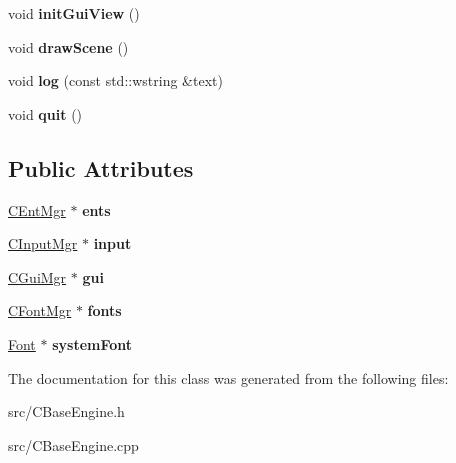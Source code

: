 \begin{DoxyCompactItemize}
\item 
\hypertarget{class_c_base_engine_a87e5248572323ef5847361177122ffcf}{
void {\bfseries initGuiView} ()}
\label{class_c_base_engine_a87e5248572323ef5847361177122ffcf}

\item 
\hypertarget{class_c_base_engine_adcff4ed3343e6e5ebd0d68c0945f72c7}{
void {\bfseries drawScene} ()}
\label{class_c_base_engine_adcff4ed3343e6e5ebd0d68c0945f72c7}

\item 
\hypertarget{class_c_base_engine_a58b7fcf0e4ab9d4a1bbc78d30af5d842}{
void {\bfseries log} (const std::wstring \&text)}
\label{class_c_base_engine_a58b7fcf0e4ab9d4a1bbc78d30af5d842}

\item 
\hypertarget{class_c_base_engine_a321c2e7107401c9d79277fa49bd28453}{
void {\bfseries quit} ()}
\label{class_c_base_engine_a321c2e7107401c9d79277fa49bd28453}

\end{DoxyCompactItemize}
\subsection*{Public Attributes}
\begin{DoxyCompactItemize}
\item 
\hypertarget{class_c_base_engine_a7bcd6139db14be811a9c5a70eeb8ef82}{
\hyperlink{class_c_ent_mgr}{CEntMgr} $\ast$ {\bfseries ents}}
\label{class_c_base_engine_a7bcd6139db14be811a9c5a70eeb8ef82}

\item 
\hypertarget{class_c_base_engine_afd4d462278f92d88035c1709f707b341}{
\hyperlink{class_c_input_mgr}{CInputMgr} $\ast$ {\bfseries input}}
\label{class_c_base_engine_afd4d462278f92d88035c1709f707b341}

\item 
\hypertarget{class_c_base_engine_a4d6c213d3f468f0248440bc69a4eb43b}{
\hyperlink{class_c_gui_mgr}{CGuiMgr} $\ast$ {\bfseries gui}}
\label{class_c_base_engine_a4d6c213d3f468f0248440bc69a4eb43b}

\item 
\hypertarget{class_c_base_engine_a4dab7710b5d4e16f44ff35059479ce46}{
\hyperlink{class_c_font_mgr}{CFontMgr} $\ast$ {\bfseries fonts}}
\label{class_c_base_engine_a4dab7710b5d4e16f44ff35059479ce46}

\item 
\hypertarget{class_c_base_engine_a24d401bf5313cb353c631ed179eaf48f}{
\hyperlink{class_font}{Font} $\ast$ {\bfseries systemFont}}
\label{class_c_base_engine_a24d401bf5313cb353c631ed179eaf48f}

\end{DoxyCompactItemize}


The documentation for this class was generated from the following files:\begin{DoxyCompactItemize}
\item 
src/CBaseEngine.h\item 
src/CBaseEngine.cpp\end{DoxyCompactItemize}
